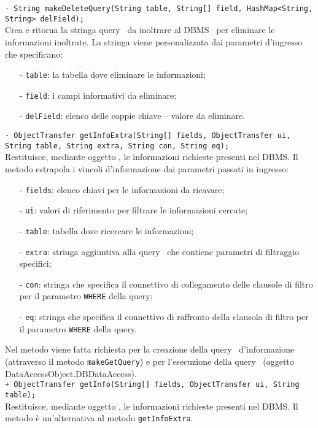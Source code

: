 {\begin{sloppypar}
{{{{\begin{itemize}
{				\texttt{- String makeDeleteQuery(String table, String[] field, HashMap<String, String> delField);}\\
				Crea e ritorna la stringa query\g~ da inoltrare al DBMS\g~ per eliminare le informazioni inoltrate.
				La stringa viene personalizzata dai parametri d'ingresso che specificano:
					\begin{itemize}
					\item[-] \texttt{table}: la tabella dove eliminare le informazioni;
					\item[-] \texttt{field}: i campi informativi da eliminare;
					\item[-] \texttt{delField}: elenco delle coppie chiave – valore da eliminare.\\
					\end{itemize}
				
				\texttt{- ObjectTransfer getInfoExtra(String[] fields, ObjectTransfer ui, String table, String extra, String con, String eq);}\\
				Restituisce, mediante oggetto , le informazioni richieste presenti nel DBMS\g. Il metodo estrapola i vincoli d'informazione dai parametri passati in ingresso:
				\begin{itemize}
					\item[-] \texttt{fields}: elenco chiavi per le informazioni da ricavare;
					\item[-] \texttt{ui}: valori di riferimento per filtrare le informazioni cercate;
					\item[-] \texttt{table}: tabella dove ricercare le informazioni;
					\item[-] \texttt{extra}: stringa aggiuntiva alla query\g~ che contiene parametri di filtraggio specifici;
					\item[-] \texttt{con}: stringa che specifica il connettivo di collegamento delle clausole di filtro per il parametro \texttt{WHERE} della query\g;
					\item[-] \texttt{eq}: stringa che specifica il connettivo di raffronto della clausola di filtro per il parametro \texttt{WHERE} della query\g.
				\end{itemize}
				Nel metodo viene fatta richiesta per la creazione della query\g~ d'informazione (attraverso il metodo  \texttt{makeGetQuery}) e per l'esecuzione della query\g~ (oggetto DataAccessObject.DBDataAccess).\\
				
				\texttt{+ ObjectTransfer getInfo(String[] fields, ObjectTransfer ui, String table);}\\
				Restituisce, mediante oggetto , le informazioni richieste presenti nel DBMS\g. Il metodo è un'alternativa al metodo \texttt{getInfoExtra}.\\
				
}
\end{itemize}}}}}
\end{sloppypar}}
